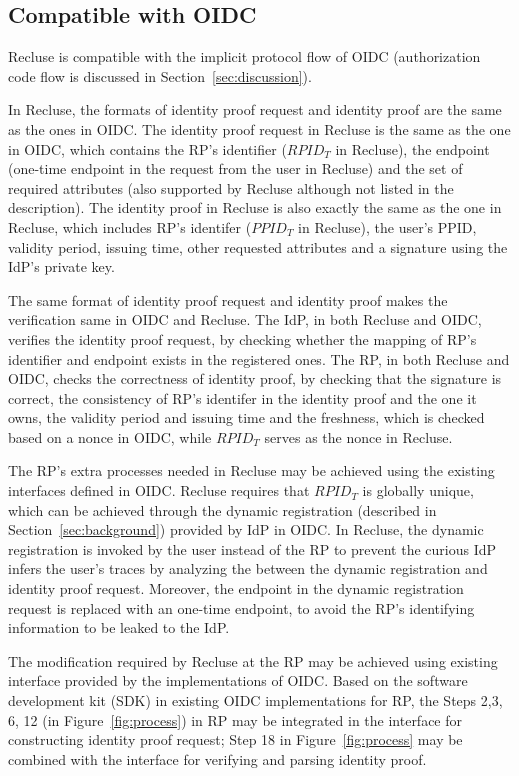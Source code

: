 \subsection{Compatible with OIDC}
\label{subsec:compatible}
Recluse is compatible with the implicit protocol flow of OIDC (authorization code flow is discussed in Section~\ref{sec:discussion}).

In Recluse, the formats of identity proof request and identity proof are the same as the ones in OIDC. The identity proof request in Recluse is the same as the one in OIDC, which contains the RP's identifier ($RPID_T$ in Recluse), the endpoint (one-time endpoint in the request from the user in Recluse) and the set of required attributes (also supported by Recluse although not listed in the description). The identity proof in Recluse is also exactly the same as the one in Recluse, which includes RP's identifer ($PPID_T$ in Recluse), the user's PPID, validity period, issuing time, other requested attributes and a signature using the IdP's private key.

The same format of identity proof request and identity proof makes the verification same in OIDC and Recluse. The IdP, in both Recluse and OIDC, verifies the identity proof request, by checking whether the mapping of RP's identifier and endpoint exists in the registered ones. The RP, in both Recluse and OIDC, checks the correctness of identity proof, by checking that the signature is correct, the consistency of RP's identifer in the identity proof and the one it owns, the validity period and issuing time and the freshness, which is checked based on a nonce in  OIDC, while  $RPID_T$ serves as the nonce in Recluse.

The RP's extra processes needed in Recluse may be achieved using the existing interfaces defined in OIDC.  Recluse requires that $RPID_T$ is globally unique, which can be achieved through the dynamic registration (described in Section~\ref{sec:background}) provided by IdP in OIDC. In Recluse, the dynamic registration is invoked by the user instead of the RP to prevent the curious IdP infers the user's traces by analyzing the between the dynamic registration and identity proof request. Moreover, the endpoint in the dynamic registration request is replaced with an one-time endpoint, to avoid the RP's identifying information to be leaked to the IdP.


The modification required by Recluse at the RP may be achieved using existing interface provided by the implementations of OIDC. Based on the software development kit (SDK) in existing OIDC implementations for RP, the Steps 2,3, 6, 12 (in Figure~\ref{fig:process}) in RP may be integrated in the interface for constructing identity proof request;
Step 18 in Figure~\ref{fig:process} may be combined with the interface for verifying and parsing identity proof. 

